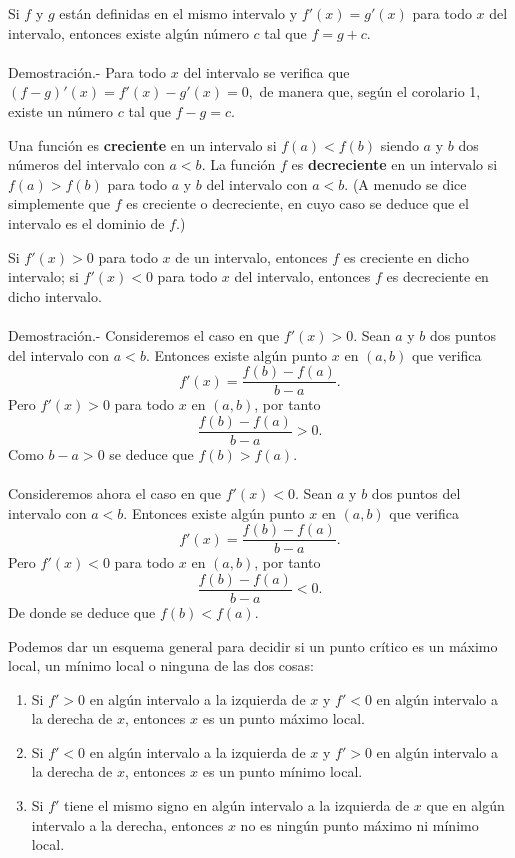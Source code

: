 \begin{cor}
    Si $f$ y $g$ están definidas en el mismo intervalo y $f'(x)=g'(x)$ para todo $x$ del intervalo, entonces existe algún número $c$ tal que $f=g+c.$\\\\
	Demostración.-\; Para todo $x$ del intervalo se verifica que $(f-g)'(x)=f'(x)-g'(x)=0,$ de manera que, según el corolario 1, existe un número $c$ tal que $f-g=c.$
\end{cor}

    \begin{def.}
	Una función es \textbf{creciente} en un intervalo si $f(a)<f(b)$ siendo $a$ y $b$ dos números del intervalo con $a<b$. La función $f$ es \textbf{decreciente} en un intervalo si $f(a)>f(b)$ para todo $a$ y $b$ del intervalo con $a<b$. (A menudo se dice simplemente que $f$ es creciente o decreciente, en cuyo caso se deduce que el intervalo es el dominio de $f$.) 
    \end{def.}

\begin{cor}
    Si $f'(x)>0$ para todo $x$ de un intervalo, entonces $f$ es creciente en dicho intervalo; si $f'(x)<0$ para todo $x$ del intervalo, entonces $f$ es decreciente en dicho intervalo.\\\\
	Demostración.-\; Consideremos el caso en que $f'(x)>0$. Sean $a$ y $b$ dos puntos del intervalo con $a<b$. Entonces existe algún punto $x$ en $(a,b)$ que verifica
	$$f'(x)=\dfrac{f(b)-f(a)}{b-a}.$$
	Pero $f'(x)>0$ para todo $x$ en $(a,b)$, por tanto 
	$$\dfrac{f(b)-f(a)}{b-a}>0.$$
	Como $b-a>0$ se deduce que $f(b)>f(a).$\\\\
	Consideremos ahora el caso en que $f'(x)<0$. Sean $a$ y $b$ dos puntos del intervalo con $a<b$. Entonces existe algún punto $x$ en $(a,b)$ que verifica
	$$f'(x)=\dfrac{f(b)-f(a)}{b-a}.$$
	Pero $f'(x)<0$ para todo $x$ en $(a,b)$, por tanto 
	$$\dfrac{f(b)-f(a)}{b-a}<0.$$
	De donde se deduce que $f(b)<f(a).$\\
\end{cor}

Podemos dar un esquema general para decidir si un punto crítico es un máximo local, un mínimo local o ninguna de las dos cosas:

\begin{enumerate}[(1)]
    \item Si $f'>0$ en algún intervalo a la izquierda de $x$ y $f'<0$ en algún intervalo a la derecha de $x$, entonces $x$ es un punto máximo local.
    \item  Si $f'<0$ en algún intervalo a la izquierda de $x$ y $f'>0$ en algún intervalo a la derecha de $x$, entonces $x$ es un punto mínimo local.
    \item Si $f'$ tiene el mismo signo en algún intervalo a la izquierda de $x$ que en algún intervalo a la derecha, entonces $x$ no es ningún punto máximo ni mínimo local.
\end{enumerate}

